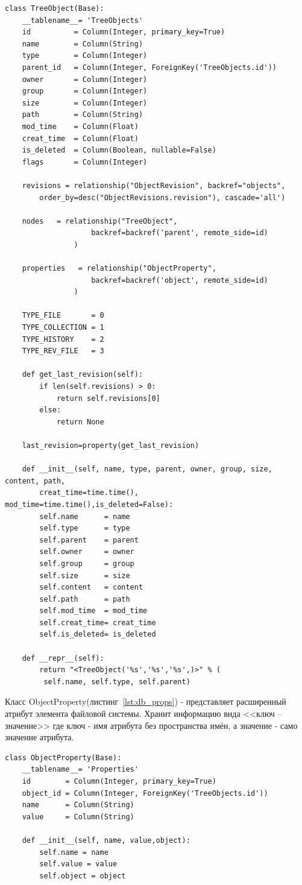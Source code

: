 \documentclass[utf8,usehyperref,12pt]{G7-32}
\begin{document}
\lstset{language=Python,caption=Таблица файловой системы,label=lst:db_treeobjects}
\begin{lstlisting} 
class TreeObject(Base):
    __tablename__= 'TreeObjects'
    id          = Column(Integer, primary_key=True)
    name        = Column(String)
    type        = Column(Integer)
    parent_id   = Column(Integer, ForeignKey('TreeObjects.id'))
    owner       = Column(Integer)
    group       = Column(Integer)
    size        = Column(Integer)    
    path        = Column(String)
    mod_time    = Column(Float)
    creat_time  = Column(Float)
    is_deleted  = Column(Boolean, nullable=False)
    flags       = Column(Integer)
    
    revisions = relationship("ObjectRevision", backref="objects", 
    	order_by=desc("ObjectRevisions.revision"), cascade='all')
    
    nodes   = relationship("TreeObject",
                    backref=backref('parent', remote_side=id)
                )   
  
    properties   = relationship("ObjectProperty",
                    backref=backref('object', remote_side=id)
                )
    
    TYPE_FILE       = 0
    TYPE_COLLECTION = 1
    TYPE_HISTORY    = 2
    TYPE_REV_FILE   = 3
    
    def get_last_revision(self):
        if len(self.revisions) > 0:
            return self.revisions[0]
        else:
            return None
    
    last_revision=property(get_last_revision)

    def __init__(self, name, type, parent, owner, group, size, content, path,
        creat_time=time.time(), mod_time=time.time(),is_deleted=False):
        self.name      = name
        self.type      = type
        self.parent    = parent
        self.owner     = owner
        self.group     = group
        self.size      = size
        self.content   = content
        self.path      = path
        self.mod_time  = mod_time
        self.creat_time= creat_time
        self.is_deleted= is_deleted

    def __repr__(self):
        return "<TreeObject('%s','%s','%s',)>" % (
         self.name, self.type, self.parent)

\end{lstlisting}


Класс ObjectProperty(листинг~\ref{lst:db_props}) - представляет расширенный атрибут элемента файловой системы. Хранит информацию вида <<ключ --значение>> где ключ - имя атрибута без пространства имён, а значение - само значение атрибута.
\lstset{language=Python,caption=Таблица свойств,label=lst:db_props}
\begin{lstlisting} 
class ObjectProperty(Base):
    __tablename__= 'Properties'
    id        = Column(Integer, primary_key=True)
    object_id = Column(Integer, ForeignKey('TreeObjects.id'))
    name      = Column(String)
    value     = Column(String) 
    
    def __init__(self, name, value,object):
        self.name = name
        self.value = value
        self.object = object
\end{lstlisting}
\end{document}
